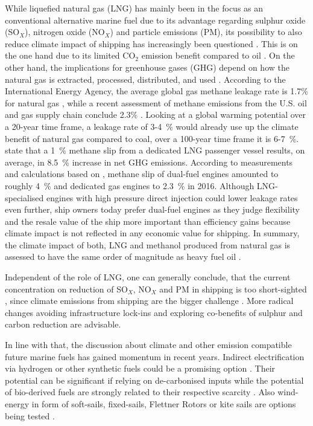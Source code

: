 \documentclass[article]{elsarticle}
\begin{document}
While liquefied natural gas (LNG) has mainly been in the focus as an conventional alternative marine fuel \cite{IMO2016a,DNVGL2015} due to its advantage regarding sulphur oxide (SO$_X$), nitrogen oxide (NO$_X$) and particle emissions (PM), its possibility to also reduce climate impact of shipping has increasingly been questioned \cite{BRYNOLF2014b}. This is on the one hand due to its limited CO$_2$ emission benefit compared to oil \cite{DNVGL2014}. On the other hand, the implications for greenhouse gases (GHG) depend on how the natural gas is extracted, processed, distributed, and used \cite{THOMSON2015}. According to the International Energy Agency, the average global gas methane leakage rate is 1.7\% for natural gas \cite{IEA2017}, while a recent assessment of methane emissions from the U.S. oil and gas supply chain conclude 2.3\% \cite{Alvarez2018}. Looking at a global warming potential over a 20-year time frame, a leakage rate of 3-4~\% would already use up the climate benefit of natural gas compared to coal, over a 100-year time frame it is 6-7~\%. \citet{HAGOS2018} state that a 1~\% methane slip from a dedicated LNG passenger vessel results, on average, in 8.5~\% increase in net GHG emissions. According to measurements and calculations based on \cite{Corbett2015,Stenersen2017}, methane slip of dual-fuel engines amounted to roughly 4~\% and dedicated gas engines to 2.3~\% in 2016. Although LNG-specialised engines with high pressure direct injection could lower leakage rates even further, ship owners today prefer dual-fuel engines as they judge flexibility and the resale value of the ship more important than efficiency gains because climate impact is not reflected in any economic value for shipping. 
In summary, the climate impact of both, LNG and methanol produced from natural gas is assessed to have the same order of magnitude as heavy fuel oil \cite{BRYNOLF2014,DNVGL2018}. 

Independent of the role of LNG, one can generally conclude, that the current concentration on reduction of SO$_X$, NO$_X$ and PM in shipping is too short-sighted \cite{Gilbert2014}, since climate emissions from shipping are the bigger challenge \cite{FRIDELL2019}. More radical changes avoiding infrastructure lock-ins and exploring co-benefits of sulphur and carbon reduction are advisable.

In line with that, the discussion about climate and other emission compatible future marine fuels has gained momentum in recent years. Indirect electrification via hydrogen or other synthetic fuels could be a promising option \cite{HORVATH2018}. Their potential can be significant if relying on de-carbonised inputs while the potential of bio-derived fuels are strongly related to their respective scarcity \cite{Gilbert2014}. Also wind-energy in form of soft-sails, fixed-sails, Flettner Rotors or kite sails are options being tested \cite{IRENA2015}.
\end{document}
